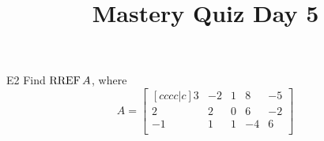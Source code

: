 \documentclass{sbgLAquiz}
\title{Mastery Quiz Day 5 }
\begin{document}
\begin{problem}{E2}
Find \(\operatorname{RREF} A\), where
\[
  A =
  \begin{bmatrix}[cccc|c]
    3 & -2 & 1 & 8 & -5 \\
    2 & 2 & 0 & 6 & -2 \\
    -1 & 1 & 1 & -4 & 6 \\
  \end{bmatrix}
\]
\end{problem}
\end{document}
